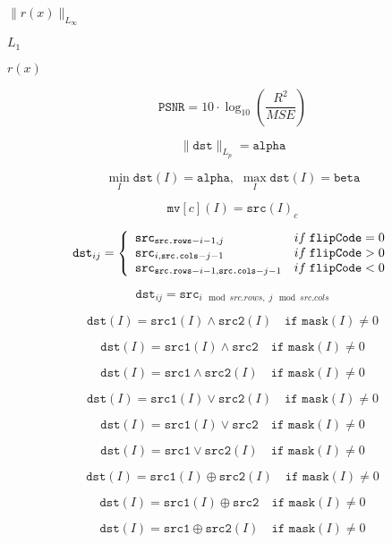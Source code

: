 \documentclass{article}
\begin{document}
$\| r(x) \|_{L_\infty}$
\pagebreak

$ L_{1} $
\pagebreak

$ r(x) $
\pagebreak

\[ \texttt{PSNR} = 10 \cdot \log_{10}{\left( \frac{R^2}{MSE} \right) } \]
\pagebreak

\[\| \texttt{dst} \| _{L_p}= \texttt{alpha}\]
\pagebreak

\[\min _I \texttt{dst} (I)= \texttt{alpha} , \, \, \max _I \texttt{dst} (I)= \texttt{beta}\]
\pagebreak

\[\texttt{mv} [c](I) = \texttt{src} (I)_c\]
\pagebreak

\[\texttt{dst} _{ij} = \left\{ \begin{array}{l l} \texttt{src} _{\texttt{src.rows}-i-1,j} & if\; \texttt{flipCode} = 0 \\ \texttt{src} _{i, \texttt{src.cols} -j-1} & if\; \texttt{flipCode} > 0 \\ \texttt{src} _{ \texttt{src.rows} -i-1, \texttt{src.cols} -j-1} & if\; \texttt{flipCode} < 0 \\ \end{array} \right.\]
\pagebreak

\[\texttt{dst} _{ij}= \texttt{src} _{i\mod src.rows, \; j\mod src.cols }\]
\pagebreak

\[\texttt{dst} (I) = \texttt{src1} (I) \wedge \texttt{src2} (I) \quad \texttt{if mask} (I) \ne0\]
\pagebreak

\[\texttt{dst} (I) = \texttt{src1} (I) \wedge \texttt{src2} \quad \texttt{if mask} (I) \ne0\]
\pagebreak

\[\texttt{dst} (I) = \texttt{src1} \wedge \texttt{src2} (I) \quad \texttt{if mask} (I) \ne0\]
\pagebreak

\[\texttt{dst} (I) = \texttt{src1} (I) \vee \texttt{src2} (I) \quad \texttt{if mask} (I) \ne0\]
\pagebreak

\[\texttt{dst} (I) = \texttt{src1} (I) \vee \texttt{src2} \quad \texttt{if mask} (I) \ne0\]
\pagebreak

\[\texttt{dst} (I) = \texttt{src1} \vee \texttt{src2} (I) \quad \texttt{if mask} (I) \ne0\]
\pagebreak

\[\texttt{dst} (I) = \texttt{src1} (I) \oplus \texttt{src2} (I) \quad \texttt{if mask} (I) \ne0\]
\pagebreak

\[\texttt{dst} (I) = \texttt{src1} (I) \oplus \texttt{src2} \quad \texttt{if mask} (I) \ne0\]
\pagebreak

\[\texttt{dst} (I) = \texttt{src1} \oplus \texttt{src2} (I) \quad \texttt{if mask} (I) \ne0\]
\pagebreak
\end{document}

